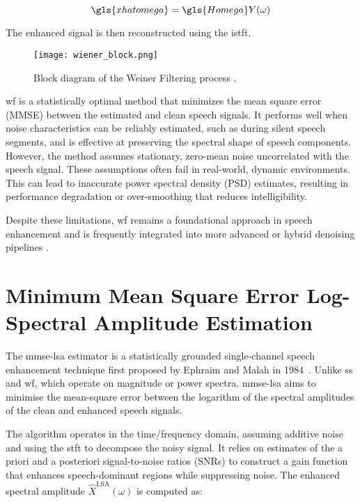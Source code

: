 \begin{equation}
    \gls{xhatomega} = \gls{Homega}Y(\omega)
\end{equation}

The enhanced signal is then reconstructed using the \gls{istft}.

\begin{figure}[h]
    \centering
    \texttt{[image: wiener\_block.png]}
    \caption{\label{fig:WienerBlock} Block diagram of the Weiner Filtering process \cite{dubey2016evaluation}.}
\end{figure}

\gls{wf} is a statistically optimal method that minimizes the mean square error (MMSE) between the estimated and clean speech signals. It performs well when noise characteristics can be reliably estimated, such as during silent speech segments, and is effective at preserving the spectral shape of speech components. However, the method assumes stationary, zero-mean noise uncorrelated with the speech signal. These assumptions often fail in real-world, dynamic environments. This can lead to inaccurate power spectral density (PSD) estimates, resulting in performance degradation or over-smoothing that reduces intelligibility.

Despite these limitations, \gls{wf} remains a foundational approach in speech enhancement and is frequently integrated into more advanced or hybrid denoising pipelines \cite{dubey2016evaluation, loizou2013speech}.


\section{Minimum Mean Square Error Log-Spectral Amplitude Estimation}
\label{sec:mmse_lsa}

The \gls{mmse-lsa} estimator is a statistically grounded single-channel speech enhancement technique first proposed by Ephraim and Malah in 1984~\cite{ephraim1984speech}. Unlike \gls{ss} and \gls{wf}, which operate on magnitude or power spectra. \gls{mmse-lsa} aims to minimise the mean-square error between the logarithm of the spectral amplitudes of the clean and enhanced speech signals.

The algorithm operates in the time/frequency domain, assuming additive noise and using the \gls{stft} to decompose the noisy signal. It relies on estimates of the a priori and a posteriori signal-to-noise ratios (SNRs) to construct a gain function that enhances speech-dominant regions while suppressing noise. The enhanced spectral amplitude \( \hat{X}^{\text{LSA}}(\omega) \) is computed as:

